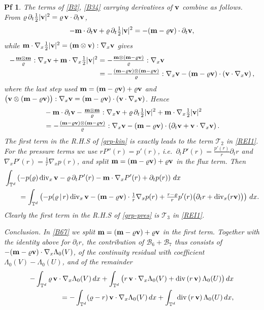 \documentclass[10pt,a4paper]{amsart}
\newtheorem{pf}{Pf}
\newcommand{\Div}{\operatorname{div}}
\newcommand{\Divx}{\operatorname{div}_x}
\newcommand{\Gradx}{\nabla_x}
\newcommand{\Lambdaz}{\Lambda_0}
\newcommand{\dx}{{\,\rm d} {x}}
\newcommand{\lr}[1]{\left( #1 \right)}
\newcommand{\vc}[1]{{\bf #1}}
\newcommand{\vm}{\vc{m}}
\newcommand{\vr}{\varrho}
\newcommand{\vv}{\vc{v}}
\begin{document}
\begin{pf}
	The terms of \eqref{B2}, \eqref{B34} carrying derivatives of $\vv$ combine as follows. From $\vr\,\partial_t\tfrac12|\vv|^2=\vr\,\vv\cdot\partial_t\vv$,
	\[
	-\vm\cdot\partial_t\vv+\vr\,\partial_t\tfrac12|\vv|^2=-(\vm-\vr\vv)\cdot\partial_t\vv ,
	\]
	while $\vm\cdot\Gradx\tfrac12|\vv|^2=(\vm\otimes\vv):\Gradx\vv$ gives
	\begin{align*}
		-\tfrac{\vm\otimes\vm}{\vr}:\Gradx\vv+\vm\cdot\Gradx\tfrac12|\vv|^2
		&=-\tfrac{\vm\otimes(\vm-\vr\vv)}{\vr}:\Gradx\vv\\
		&=-\tfrac{(\vm-\vr\vv)\otimes(\vm-\vr\vv)}{\vr}:\Gradx\vv-(\vm-\vr\vv)\cdot\lr{\vv\cdot\Gradx\vv},
	\end{align*}
	where the last step used $\vm=(\vm-\vr\vv)+\vr\vv$ and $\big(\vv\otimes(\vm-\vr\vv)\big):\Gradx\vv=(\vm-\vr\vv)\cdot(\vv\cdot\Gradx\vv)$. Hence
	\begin{equation}\label{grp-kin}
		\begin{aligned}
			&	-\vm\cdot\partial_t\vv-\tfrac{\vm\otimes\vm}{\vr}:\Gradx\vv
			+\vr\,\partial_t\tfrac12|\vv|^2+\vm\cdot\Gradx\tfrac12|\vv|^2 \\
			&	=-\tfrac{(\vm-\vr\vv)\otimes(\vm-\vr\vv)}{\vr}:\Gradx\vv
			-(\vm-\vr\vv)\cdot\lr{\partial_t\vv+\vv\cdot\Gradx\vv} .			
		\end{aligned}
	\end{equation}
	The first term in the R.H.S of \eqref{grp-kin} is exactly leads to the term $\mathcal{T}_2$ in \eqref{REI1}.
	For the pressure terms we use $rP''(r)=p'(r)$, i.e.\ $\partial_tP'(r)=\tfrac{p'(r)}{r}\partial_tr$ and $\Gradx P'(r)=\tfrac1r\Gradx p(r)$, and split $\vm=(\vm-\vr\vv)+\vr\vv$ in the flux term. Then
	\begin{equation}\label{grp-pres}
		\begin{aligned}
			&\int_{\mathbb T^d}\lr{-p(\vr)\Divx\vv-\vr\,\partial_tP'(r)-\vm\cdot\Gradx P'(r)+\partial_tp(r)}\dx\\
			&\qquad=\int_{\mathbb T^d}\lr{-p(\vr\,|\,r)\Divx\vv-(\vm-\vr\vv)\cdot\tfrac1r\Gradx p(r)
				+\tfrac{r-\vr}{r}p'(r)\big(\partial_tr+\Divx(r\vv)\big)}\dx .
		\end{aligned}
	\end{equation}
	Clearly the first term in the  R.H.S of \eqref{grp-pres} is $\mathcal{T}_3$ in \eqref{REI1}.

	
	\smallskip


	 \noindent\emph{Conclusion.} In \eqref{B67} we split $\vm=(\vm-\vr\vv)+\vr\vv$ in the first term. Together with the identity above for $\partial_t r$, the contribution of $\mathcal B_6+\mathcal B_7$ thus consists of $-(\vm-\vr\vv)\cdot\Gradx\Lambdaz(V)$, of the continuity residual with coefficient $\Lambdaz(V)-\Lambdaz(U)$, and of the remainder
	\begin{align*}
			 -\int_{\mathbb T^d}\vr\,\vv\cdot\Gradx\Lambdaz(V)\dx 
		 + \int_{\mathbb T^d}\big( r\,\vv\cdot \Gradx \Lambdaz(V)+ \Div \lr{ r\,\vv}\Lambdaz(U)\big) \dx\\
		=-\int_{\mathbb T^d}(\vr-r)\,\vv\cdot\Gradx\Lambdaz(V)\dx+\int_{\mathbb T^d} \Div\lr{r\,\vv} \Lambdaz(U)\dx ,
	\end{align*}
	

\end{pf}
\end{document}
